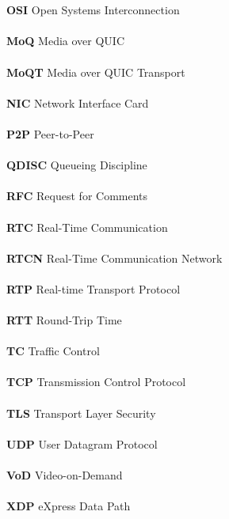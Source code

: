 \begin{tabbing}
    \\\\\textbf{OSI} \> Open Systems Interconnection
    \\\\\textbf{MoQ} \> Media over QUIC
    \\\\\textbf{MoQT} \> Media over QUIC Transport
    \\\\\textbf{NIC} \> Network Interface Card
    \\\\\textbf{P2P} \> Peer-to-Peer
    \\\\\textbf{QDISC} \> Queueing Discipline
    \\\\\textbf{RFC} \> Request for Comments
    \\\\\textbf{RTC} \> Real-Time Communication
    \\\\\textbf{RTCN} \> Real-Time Communication Network
    \\\\\textbf{RTP} \> Real-time Transport Protocol
    \\\\\textbf{RTT} \> Round-Trip Time
    \\\\\textbf{TC} \> Traffic Control
    \\\\\textbf{TCP} \> Transmission Control Protocol
    \\\\\textbf{TLS} \> Transport Layer Security
    \\\\\textbf{UDP} \> User Datagram Protocol
    \\\\\textbf{VoD} \> Video-on-Demand
    \\\\\textbf{XDP} \> eXpress Data Path
\end{tabbing}


